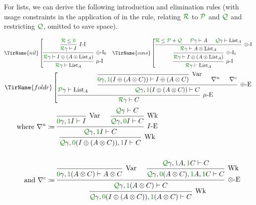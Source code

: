 \begin{example}\label{thm:list-rules}
  For lists, we can derive the following introduction and elimination rules
  (with usage constraints in the application of  in the
   rule, relating $\grR$ to $\grP$ and $\grQ$ and restricting
  $\grQ$, omitted to save space).

  \begin{align*}
    \TirName{nil}\left[
    \begin{prooftree}
      \hypo{\grR \leq \gr0}
      \infer1[$I$-I]{\grR\gamma \vdash I}
      \infer1[$\oplus$-I$_0$]%
      {\grR\gamma \vdash I \oplus \plr{A \otimes \mathrm{List}_A}}
      \infer1[$\mu$-I]{\grR\gamma \vdash \mathrm{List}_A}
    \end{prooftree}
    \right.
    &&
    \TirName{cons}\left[
    \begin{prooftree}
      \hypo{\grR \leq \grP + \grQ}
      \hypo{\grP\gamma \vdash A}
      \hypo{\grQ\gamma \vdash \mathrm{List}_A}
      \infer3[$\otimes$-I]{\grR\gamma \vdash A \otimes \mathrm{List}_A}
      \infer1[$\oplus$-I$_1$]%
      {\grR\gamma \vdash I \oplus \plr{A \otimes \mathrm{List}_A}}
      \infer1[$\mu$-I]{\grR\gamma \vdash \mathrm{List}_A}
    \end{prooftree}
    \right.
  \end{align*}
  \begin{displaymath}
    \TirName{foldr}\left[
    \begin{prooftree}
      \hypo{\grP\gamma \vdash \mathrm{List}_A}
      \infer0[Var]{\gr0\gamma, \gr1\plr{I \oplus \plr{A \otimes C}}
        \vdash I \oplus \plr{A \otimes C}}
      \hypo{\nabla^n}
      \hypo{\nabla^c}
      \infer3[$\oplus$-E]{\grQ\gamma, \gr1\plr{I \oplus \plr{A \otimes C}}
        \vdash C}
      \infer2[$\mu$-E]{\grR\gamma \vdash C}
    \end{prooftree}
    \right.
  \end{displaymath}
  \begin{align*}
    \textrm{where }\nabla^n &\coloneqq
    \begin{prooftree}
      \infer0[Var]{\gr0\gamma, \gr1I \vdash I}
      \hypo{\grQ\gamma \vdash C}
      \infer1[Wk]{\grQ\gamma, \gr0I \vdash C}
      \infer2[$I$-E]{\grQ\gamma, \gr1I \vdash C}
      \infer1[Wk]{\grQ\gamma, \gr0\plr{I \oplus \plr{A \otimes C}}, \gr1I
        \vdash C}
    \end{prooftree}
    \\\\
    \textrm{and }\nabla^c &\coloneqq
    \begin{prooftree}
      \infer0[Var]{\gr0\gamma, \gr1\plr{A \otimes C} \vdash A \otimes C}
      \hypo{\grQ\gamma, \gr1A, \gr1C \vdash C}
      \infer1[Wk]{\grQ\gamma, \gr0\plr{A \otimes C}, \gr1A, \gr1C \vdash C}
      \infer2[$\otimes$-E]{\grQ\gamma, \gr1\plr{A \otimes C} \vdash C}
      \infer1[Wk]%
      {\grQ\gamma, \gr0\plr{I \oplus \plr{A \otimes C}}, \gr1\plr{A \otimes C}
        \vdash C}
    \end{prooftree}
  \end{align*}
\end{example}

